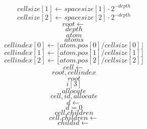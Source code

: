 \documentclass{scrreprt}
\begin{document}
\begin{equation}
cellsize[1] \gets spacesize[1]\cdot2^{-depth}
\end{equation}
\begin{equation}
cellsize[2] \gets spacesize[2]\cdot2^{-depth}
\end{equation}
\begin{equation}
root \gets
\end{equation}
\begin{equation}
depth
\end{equation}
\begin{equation}
atom
\end{equation}
\begin{equation}
atoms
\end{equation}
\begin{equation}
cellindex[0] \gets \lfloor atom.pos[0] / cellsize[0] \rfloor
\end{equation}
\begin{equation}
cellindex[1] \gets \lfloor atom.pos[1] / cellsize[1] \rfloor
\end{equation}
\begin{equation}
cellindex[2] \gets \lfloor atom.pos[2] / cellsize[2] \rfloor
\end{equation}
\begin{equation}
cell \gets
\end{equation}
\begin{equation}
root, cellindex
\end{equation}
\begin{equation}
root
\end{equation}
\begin{equation}
i[3]
\end{equation}
\begin{equation}
allocate
\end{equation}
\begin{equation}
cell, id, allocate
\end{equation}
\begin{equation}
d \gets 
\end{equation}
\begin{equation}
d = 0
\end{equation}
\begin{equation}
cell.children
\end{equation}
\begin{equation}
cell.children \gets 
\end{equation}
\begin{equation}
childid \gets 
\end{equation}
\end{document}
